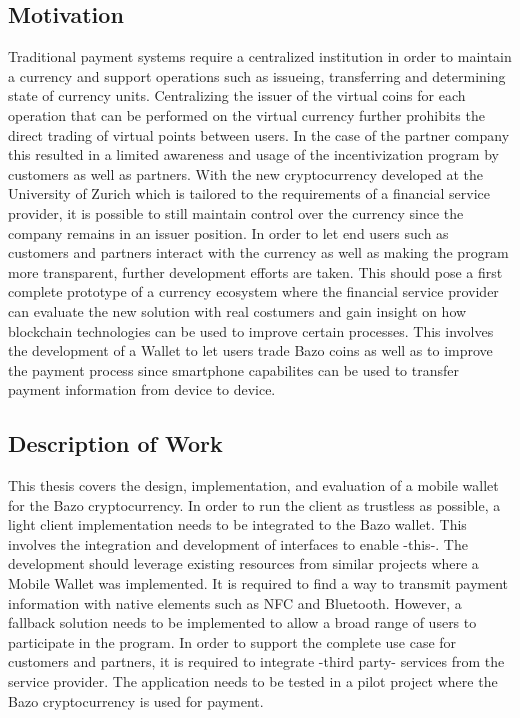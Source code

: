 \documentclass[a4paper]{article}
\begin{document}
\subsection{Motivation}
Traditional payment systems require a centralized institution in order to maintain a currency and support operations such as issueing, transferring and determining state of currency units. Centralizing the issuer of the virtual coins for each operation that can be performed on the virtual currency further prohibits the direct trading of virtual points between users.
In the case of the partner company this resulted in a limited awareness and usage of the incentivization program by customers as well as partners.
With the new cryptocurrency developed at the University of Zurich which is tailored to the requirements of a financial service provider, it is possible to still maintain control over the currency since the company remains in an issuer position. In order to let end users such as customers and partners interact with the currency as well as making the program more transparent, further development efforts are taken. This should pose a first complete prototype of a currency ecosystem where the financial service provider can evaluate the new solution with real costumers and gain insight on how blockchain technologies can be used to improve certain processes. This involves the development of a Wallet to let users trade Bazo coins as well as to improve the payment process since smartphone capabilites can be used to transfer payment information from device to device.

\subsection{Description of Work}
This thesis covers the design, implementation, and evaluation of a mobile wallet for the Bazo cryptocurrency. In order to run the client as trustless as possible, a light client implementation needs to be integrated to the Bazo wallet. This involves the integration and development of interfaces to enable -this-.
The development should leverage existing resources from similar projects where a Mobile Wallet was implemented.
It is required to find a way to transmit payment information with native elements such as NFC and Bluetooth. However, a fallback solution needs to be implemented to allow a broad range of users to participate in the program.
In order to support the complete use case for customers and partners, it is required to integrate -third party- services from the service provider.
The application needs to be tested in a pilot project where the Bazo cryptocurrency is used for payment. 
\end{document}
